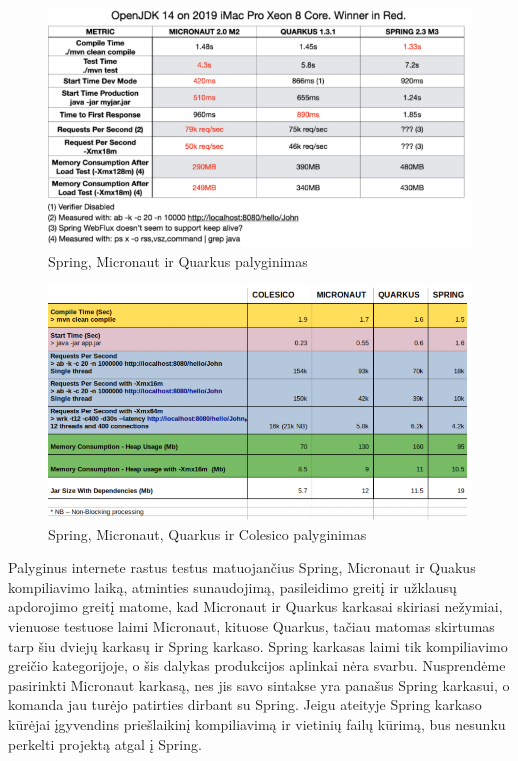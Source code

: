 \documentclass{VUMIFPSkursinis}
\begin{document}
			\begin{figure}[H]
			\includegraphics[scale=0.85]{img/one}
			\caption{Spring, Micronaut ir Quarkus palyginimas} %
			\label{img:kurimoProcesas}
			\end{figure}
			\begin{figure}[H]
			\includegraphics[scale=0.7]{img/two}
			\caption{Spring, Micronaut, Quarkus ir Colesico palyginimas} %
			\label{img:kurimoProcesas}
			\end{figure}
		Palyginus internete rastus testus \cite{one,two,three} matuojančius Spring, Micronaut ir Quakus kompiliavimo laiką, atminties sunaudojimą, pasileidimo greitį ir užklausų apdorojimo greitį
		matome, kad Micronaut ir Quarkus karkasai skiriasi nežymiai, vienuose testuose laimi Micronaut, kituose Quarkus, tačiau matomas skirtumas tarp šiu dviejų karkasų ir Spring karkaso.
		Spring karkasas laimi tik kompiliavimo greičio kategorijoje, o šis dalykas produkcijos aplinkai nėra svarbu.
		Nusprendėme pasirinkti Micronaut karkasą, nes jis savo sintakse yra panašus Spring karkasui, o komanda jau turėjo patirties dirbant su Spring.
		Jeigu ateityje Spring karkaso kūrėjai įgyvendins priešlaikinį kompiliavimą ir vietinių failų kūrimą, bus nesunku perkelti projektą atgal į Spring.
\end{document}
